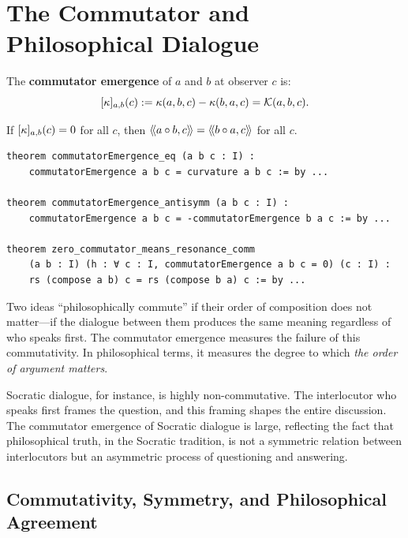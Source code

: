 \section{The Commutator and Philosophical Dialogue}

\begin{definition}
The \textbf{commutator emergence} of $a$ and $b$ at observer $c$ is:
\[
  [\kappa]_{a,b}(c) := \kappa(a,b,c) - \kappa(b,a,c) = \mathcal{K}(a,b,c).
\]
\end{definition}

\begin{theorem}
\label{thm:zero-commutator}
If $[\kappa]_{a,b}(c) = 0$ for all $c$, then $\langle\!\langle a \circ b, c \rangle\!\rangle = \langle\!\langle b \circ a, c \rangle\!\rangle$
for all $c$.
\end{theorem}

\begin{lstlisting}[caption={Commutator emergence (IDT\_v3\_Emergence.lean)}]
theorem commutatorEmergence_eq (a b c : I) :
    commutatorEmergence a b c = curvature a b c := by ...

theorem commutatorEmergence_antisymm (a b c : I) :
    commutatorEmergence a b c = -commutatorEmergence b a c := by ...

theorem zero_commutator_means_resonance_comm
    (a b : I) (h : ∀ c : I, commutatorEmergence a b c = 0) (c : I) :
    rs (compose a b) c = rs (compose b a) c := by ...
\end{lstlisting}

\begin{interpretation}
Two ideas ``philosophically commute'' if their order of composition does not
matter---if the dialogue between them produces the same meaning regardless of
who speaks first. The commutator emergence measures the failure of this
commutativity. In philosophical terms, it measures the degree to which
\emph{the order of argument matters}.

Socratic dialogue, for instance, is highly non-commutative. The interlocutor
who speaks first frames the question, and this framing shapes the entire
discussion. The commutator emergence of Socratic dialogue is large, reflecting
the fact that philosophical truth, in the Socratic tradition, is not a
symmetric relation between interlocutors but an asymmetric process of
questioning and answering.
\end{interpretation}

\subsection{Commutativity, Symmetry, and Philosophical Agreement}

